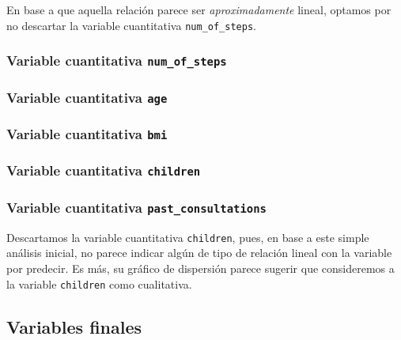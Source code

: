 \documentclass[
  letterpaper,
  DIV=11,
  numbers=noendperiod]{scrartcl}
\begin{document}
En base a que aquella relación parece ser \emph{aproximadamente} lineal,
optamos por no descartar la variable cuantitativa
\texttt{num\_of\_steps}.

\subsubsection{\texorpdfstring{Variable cuantitativa
\texttt{num\_of\_steps}}{Variable cuantitativa num\_of\_steps}}\label{variable-cuantitativa-num_of_steps-1}

\subsubsection{\texorpdfstring{Variable cuantitativa
\texttt{age}}{Variable cuantitativa age}}\label{variable-cuantitativa-age}

\subsubsection{\texorpdfstring{Variable cuantitativa
\texttt{bmi}}{Variable cuantitativa bmi}}\label{variable-cuantitativa-bmi}

\subsubsection{\texorpdfstring{Variable cuantitativa
\texttt{children}}{Variable cuantitativa children}}\label{variable-cuantitativa-children}

\subsubsection{\texorpdfstring{Variable cuantitativa
\texttt{past\_consultations}}{Variable cuantitativa past\_consultations}}\label{variable-cuantitativa-past_consultations}

Descartamos la variable cuantitativa \texttt{children}, pues, en base a
este simple análisis inicial, no parece indicar algún de tipo de
relación lineal con la variable por predecir. Es más, su gráfico de
dispersión parece sugerir que consideremos a la variable
\texttt{children} como cualitativa.

\subsection{Variables finales}\label{variables-finales}
\end{document}
